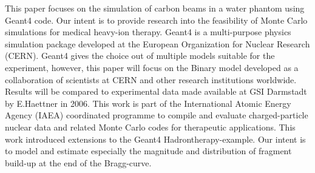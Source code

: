 \begin{abstractpage}[english]
This paper focuses on the simulation of carbon beams in a water phantom using Geant4 code. Our intent is to provide research into the feasibility of Monte Carlo simulations for medical heavy-ion therapy. Geant4 is a multi-purpose physics simulation package developed at the European Organization for Nuclear Research (CERN). Geant4 gives the choice out of multiple models suitable for the experiment, however, this paper will focus on the Binary model developed as a collaboration of scientists at CERN and other research institutions worldwide. Results will be compared to experimental data made available at GSI Darmstadt by E.Haettner in 2006. This work is part of the International Atomic Energy Agency (IAEA) coordinated programme to compile and evaluate charged-particle nuclear data and related Monte Carlo codes for therapeutic applications. This work introduced extensions to the Geant4 Hadrontherapy-example. Our intent is to model and estimate especially the magnitude and distribution of fragment build-up at the end of the Bragg-curve.
\end{abstractpage}

\newpage



\tableofcontents


%


\cleardoublepage
\storeinipagenumber
{}
\setcounter{page}{1}


